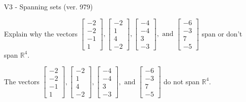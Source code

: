 \begin{exercise}
  \begin{exerciseTitle}V3 - Spanning sets (ver. 979)\end{exerciseTitle}
  \begin{exerciseStatement}
    Explain why the vectors \(\left[\begin{array}{r}
-2 \\
-2 \\
-1 \\
1
\end{array}\right] , \left[\begin{array}{r}
-2 \\
1 \\
4 \\
-2
\end{array}\right] , \left[\begin{array}{r}
-4 \\
-4 \\
3 \\
-3
\end{array}\right] , \text{ and } \left[\begin{array}{r}
-6 \\
-3 \\
7 \\
-5
\end{array}\right]\) span or don't span \(\mathbb{R}^4\). 
	


  \end{exerciseStatement}
  \begin{exerciseAnswer}
   The vectors \(\left[\begin{array}{r}
-2 \\
-2 \\
-1 \\
1
\end{array}\right] , \left[\begin{array}{r}
-2 \\
1 \\
4 \\
-2
\end{array}\right] , \left[\begin{array}{r}
-4 \\
-4 \\
3 \\
-3
\end{array}\right] , \text{ and } \left[\begin{array}{r}
-6 \\
-3 \\
7 \\
-5
\end{array}\right]\) 
  	 do not  
	span \(\mathbb{R}^4\).
  


  \end{exerciseAnswer}
\end{exercise}
